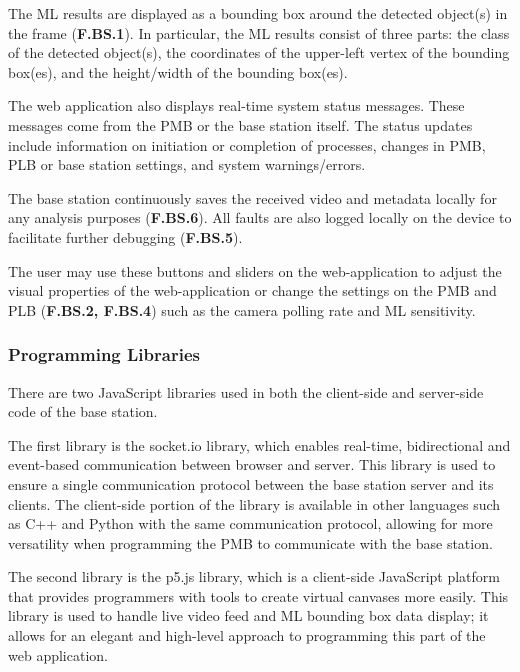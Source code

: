 The ML results are displayed as a bounding box around the detected object(s) in the frame (\textbf{F.BS.1}). In particular, the ML results consist of three parts: the class of the detected object(s), the coordinates of the upper-left vertex of the bounding box(es), and the height/width of the bounding box(es).

The web application also displays real-time system status messages. These messages come from the PMB or the base station itself. The status updates include information on initiation or completion of processes, changes in PMB, PLB or base station settings, and system warnings/errors.

The base station continuously saves the received video and metadata locally for any analysis purposes (\textbf{F.BS.6}). All faults are also logged locally on the device to facilitate further debugging (\textbf{F.BS.5}).

The user may use these buttons and sliders on the web-application to adjust the visual properties of the web-application or change the settings on the PMB and PLB (\textbf{F.BS.2, F.BS.4}) such as the camera polling rate and ML sensitivity.

\subsubsection{Programming Libraries}

There are two JavaScript libraries used in both the client-side and server-side code of the base station.

The first library is the socket.io library, which enables real-time, bidirectional and event-based communication between browser and server. This library is used to ensure a single communication protocol between the base station server and its clients. The client-side portion of the library is available in other languages such as C++ and Python with the same communication protocol, allowing for more versatility when programming the PMB to communicate with the base station. 

The second library is the p5.js library, which is a client-side JavaScript platform that provides programmers with tools to create virtual canvases more easily. This library is used to handle live video feed and ML bounding box data display; it allows for an elegant and high-level approach to programming this part of the web application. 
